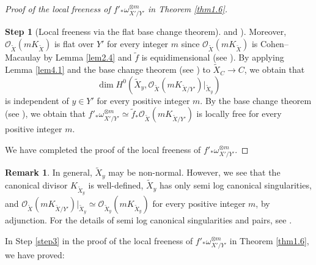 \documentclass[12pt,twoside]{amsart}
\theoremstyle{definition}
\newtheorem{rem}[thm]{Remark}
\newtheorem{step}{Step}
\begin{document}
\begin{proof}[Proof of the local freeness of $f'_*\omega^{\otimes m}_{X'/Y'}$ 
in Theorem \ref{thm1.6}]
\begin{step}[Local freeness via the 
flat base change theorem]
and \cite[Chapter V, Proposition (3.5)]{altman-kleiman}). 
Moreover, $\mathcal O_{\widetilde X}(mK_{\widetilde X})$ is 
flat over $Y'$ for every integer $m$ since $\mathcal O_{\widetilde X}(m
K_{\widetilde X})$ is Cohen--Macaulay by Lemma \ref{lem2.4} and 
$\widetilde f$ is equidimensional (see \cite[Chapter V, Proposition (3.5)]
{altman-kleiman}). 
By applying Lemma \ref{lem4.1} and 
the base change theorem (see \cite[Chapter III, Theorem 12.11]{hartshorne}) 
to $\widetilde X_C\to C$, 
we obtain that 
$$
\dim H^0({\widetilde X}_y, 
\mathcal O_{\widetilde X}(mK_{\widetilde X/Y'})|_{\widetilde X_y})
$$ 
is independent of $y\in Y'$ for every positive integer $m$. 
By the base change theorem (see \cite[Chapter III, Corollary 12.9]{hartshorne}), 
we obtain that 
$f'_*\omega^{\otimes m}_{X'/Y'} 
\simeq 
{\widetilde f}_*\mathcal O_{\widetilde X}(mK_{\widetilde {X}/Y'})$ is 
locally free for every positive integer $m$. 
\end{step}
We have 
completed the proof of the local freeness of $f'_*\omega^{\otimes m}_{X'/Y'}$. 
\end{proof}

\begin{rem}
In general, $\widetilde X_y$ may be non-normal. 
However, we see that the canonical 
divisor $K_{\widetilde X_y}$ is well-defined, 
$\widetilde X_y$ has only semi log canonical singularities, 
and  $\mathcal O_{\widetilde X}(mK_{\widetilde X/Y'})|_{\widetilde X_y}
\simeq \mathcal O_{\widetilde X_y}(mK_{\widetilde X_y})$ 
for every positive integer $m$, by 
adjunction. 
For the details of semi log canonical singularities and pairs, 
see \cite{fujino-slc}. 
\end{rem}

In Step \ref{step3} in the proof of the local freeness of $f'_*\omega^{\otimes m}
_{X'/Y'}$ in Theorem \ref{thm1.6}, we have proved: 
\end{document}
